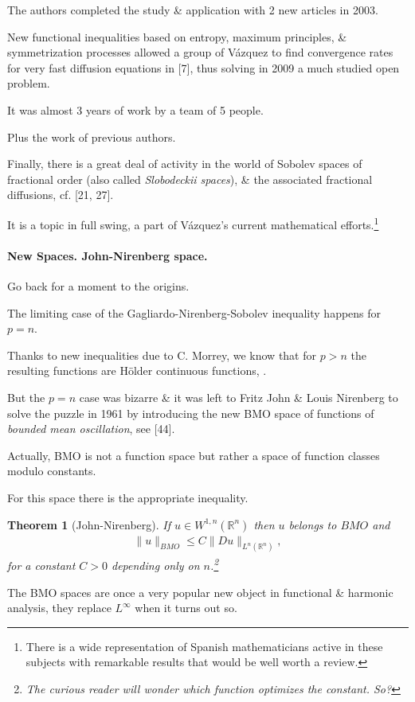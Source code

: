 \documentclass{article}
\newtheorem{theorem}{Theorem}
\begin{document}
The authors completed the study \& application with 2 new articles in 2003.

New functional inequalities based on entropy, maximum principles, \& symmetrization processes allowed a group of V\'azquez to find convergence rates for very fast diffusion equations in [7], thus solving in 2009 a much studied open problem.

It was almost 3 years of work by a team of 5 people.

Plus the work of previous authors.

%
Finally, there is a great deal of activity in the world of Sobolev spaces of fractional order (also called \textit{Slobodeckii spaces}), \& the associated fractional diffusions, cf. [21, 27].

It is a topic in full swing, a part of V\'azquez's current mathematical efforts.\footnote{There is a wide representation of Spanish mathematicians active in these subjects with remarkable results that would be well worth a review.}

\paragraph{New Spaces. John-Nirenberg space.} Go back for a moment to the origins.

The limiting case of the Gagliardo-Nirenberg-Sobolev inequality happens for $p = n$.

Thanks to new inequalities due to C. Morrey, we know that for $p > n$ the resulting functions are H\"older continuous functions, \cite{Evans2010}.

But the $p = n$ case was bizarre \& it was left to Fritz John \& Louis Nirenberg to solve the puzzle in 1961 by introducing the new BMO space of functions of \textit{bounded mean oscillation}, see [44].

Actually, BMO is not a function space but rather a space of function classes modulo constants.

For this space there is the appropriate inequality.

\begin{theorem}[John-Nirenberg]
	If $u\in W^{1,n}(\mathbb{R}^n)$ then $u$ belongs to $BMO$ and
	\begin{align*}
		\|u\|_{BMO}\le C\|Du\|_{L^n(\mathbb{R}^n)},
	\end{align*}
	for a constant $C > 0$ depending only on $n$.\footnote{The curious reader will wonder which function optimizes the constant. So?}
\end{theorem}
The BMO spaces are once a very popular new object in functional \& harmonic analysis, they replace $L^\infty$ when it turns out so.
\end{document}
